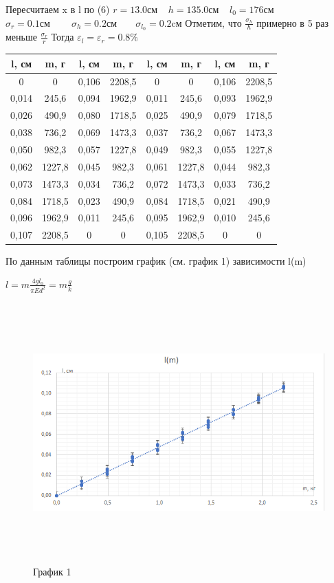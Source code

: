 \documentclass[12pt,a4paper]{article}
\begin{document}
Пересчитаем x в l по (6)\hfill \break
$r=13.0 \text{см} \;\;\;\; h=135.0 \text{см} \;\;\;\; l_{0}=176\text{см}$
\flushleft $\sigma_{r}= 0.1 \text{см} \;\;\;\;\;\;\;\; \sigma_{h}=0.2 \text{см} \;\;\;\;\;\;\; \sigma_{l_{0}}=0.2\text{cм}$ \hfill \break
Отметим, что $\frac{\sigma_{h}}{h}$ примерно в 5 раз меньше $\frac{\sigma_{r}}{r}$ Тогда $\varepsilon_{l}=\varepsilon_{r}=0.8\%$
\begin{tabular}{|c|c|c|c|c|c|c|c|}
\hline 
l, см & m, г & l, см &  m, г &l, см & m, г &l, см & m, г \\ 
\hline 
0 & 0 & 0,106 & 2208,5 & 0 & 0 & 0,106 & 2208,5 \\ 
\hline 
0,014 & 245,6 & 0,094 & 1962,9 & 0,011 & 245,6 & 0,093 & 1962,9 \\ 
\hline 
0,026 & 490,9 & 0,080 & 1718,5 & 0,025 & 490,9 & 0,079 & 1718,5 \\ 
\hline 
0,038 & 736,2 & 0,069 & 1473,3 & 0,037 & 736,2 & 0,067 & 1473,3 \\ 
\hline 
0,050 & 982,3 & 0,057 & 1227,8 & 0,049 & 982,3 & 0,055 & 1227,8 \\ 
\hline 
0,062 & 1227,8 & 0,045 & 982,3 & 0,061 & 1227,8 & 0,044 & 982,3 \\ 
\hline 
0,073 & 1473,3 & 0,034 & 736,2 & 0,072 & 1473,3 & 0,033 & 736,2 \\ 
\hline 
0,084 & 1718,5 & 0,023 & 490,9 & 0,084 & 1718,5 & 0,021 & 490,9 \\ 
\hline 
0,096 & 1962,9 & 0,011 & 245,6 & 0,095 & 1962,9 & 0,010 & 245,6 \\ 
\hline 
0,107 & 2208,5 & 0 & 0 & 0,105 & 2208,5 & 0 & 0 \\ 
\hline 
\end{tabular} 
\hfill \break	
\hfill \break
По данным таблицы построим график (см. график 1) зависимости l(m)
\begin{center}
$l=m\frac{4gl_{0}}{\pi{Ed^2}}=m\frac{g}{k}$ 
\end{center}
\begin{figure}[h]
\centering
\includegraphics[width=18cm, height=10cm]{1.3.1_gr_1}
\caption{График 1}
\label{gr:1}
\end{figure}
\end{document}
